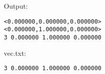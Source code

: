 \documentclass[12pt, a4paper]{article}
\begin{document}
Output:\\
\begin{scriptsize}
\begin{ttfamily}
\begin{lstlisting}
<0.000000,0.000000,0.000000>
<0.000000,1.000000,0.000000>
3 0.000000 1.000000 0.000000 
\end{lstlisting}
\end{ttfamily}
\end{scriptsize}

vec.txt:\\
\begin{scriptsize}
\begin{ttfamily}
\begin{lstlisting}
3 0.000000 1.000000 0.000000
\end{lstlisting}
\end{ttfamily}
\end{scriptsize}
\end{document}
